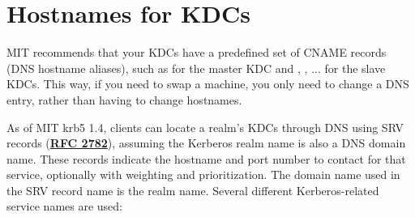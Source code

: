 \documentclass[letterpaper,10pt,english]{sphinxmanual}
\begin{document}
\section{Hostnames for KDCs}
\label{admin/realm_config:kdc-hostnames}\label{admin/realm_config:hostnames-for-kdcs}
MIT recommends that your KDCs have a predefined set of CNAME records
(DNS hostname aliases), such as  for the master KDC and
, , ... for the slave KDCs.  This way, if
you need to swap a machine, you only need to change a DNS entry,
rather than having to change hostnames.

As of MIT krb5 1.4, clients can locate a realm's KDCs through DNS
using SRV records (\href{http://tools.ietf.org/html/rfc2782.html}{\textbf{RFC 2782}}), assuming the Kerberos realm name is
also a DNS domain name.  These records indicate the hostname and port
number to contact for that service, optionally with weighting and
prioritization.  The domain name used in the SRV record name is the
realm name.  Several different Kerberos-related service names are
used:
\end{document}
